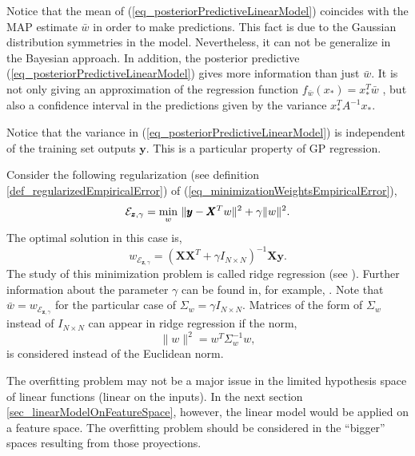 \begin{remark}
  Notice that the mean of (\ref{eq_posteriorPredictiveLinearModel}) coincides with the MAP estimate $\bar{w}$ in order to make predictions. This fact is due to the Gaussian distribution symmetries in the model. Nevertheless, it can not be generalize in the Bayesian approach. In addition, the posterior predictive (\ref{eq_posteriorPredictiveLinearModel}) gives more information than just $\bar{w}$. It is not only giving an approximation of the regression function $f_{\bar{w}}(x_*) = x_*^T \bar{w}$ , but also a confidence interval in the predictions given by the variance $x_*^T A^{-1} x_*$.
\end{remark}

\begin{remark}
  Notice that the variance in (\ref{eq_posteriorPredictiveLinearModel}) is independent of the training set outputs $\pmb{y}$. This is a particular property of GP regression.
\end{remark}

\begin{remark} \label{remark_regularizingMinimizationWeightsEmpiricalError}
  Consider the following regularization (see definition \ref{def_regularizedEmpiricalError}) of (\ref{eq_minimizationWeightsEmpiricalError}), 
\begin{equation*}
  \mathcal{E}_{\pmb{z},\gamma} = \underset{w}{\textup{min}} \ \| \pmb{y} - \pmb{X}^T w \|^2 + \gamma \|w\|^2.
\end{equation*} 
The optimal solution in this case is,
\begin{equation*}
  w_{\mathcal{E}_{\pmb{z},\gamma}} = \left( \pmb{X}\pmb{X}^T + \gamma I_{N \times N} \right)^{-1}\pmb{X}\pmb{y}.
\end{equation*}
The study of this minimization problem is called ridge regression (see \textcite{hoerl1970}). Further information about the parameter $\gamma$ can be found in, for example, \textcite{golub1979}. Note that $\bar{w} = w_{\mathcal{E}_{\pmb{z},\gamma}}$ for the particular case of $\Sigma_w = \gamma I_{N \times N}$. Matrices of the form of $\Sigma_w$ instead of $I_{N \times N}$ can appear in ridge regression if the norm,
\begin{equation*} 
  \|w\|^2 = w^T \Sigma_w^{-1} w,
\end{equation*}
is considered instead of the Euclidean norm.
\end{remark}

\begin{remark} \label{remark_GPandOverfittingProblem}
  The overfitting problem may not be a major issue in the limited hypothesis space of linear functions (linear on the inputs). In the next section \ref{sec_linearModelOnFeatureSpace}, however, the linear model would be applied on a feature space. The overfitting problem should be considered in the ``bigger'' spaces resulting from those proyections.
\end{remark}

